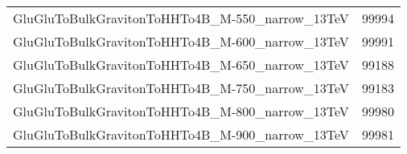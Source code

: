 \begin{table}[h]
\begin{tabular}{ll}
GluGluToBulkGravitonToHHTo4B\_M-550\_narrow\_13TeV & 99994            \\
GluGluToBulkGravitonToHHTo4B\_M-600\_narrow\_13TeV & 99991            \\
GluGluToBulkGravitonToHHTo4B\_M-650\_narrow\_13TeV & 99188            \\
GluGluToBulkGravitonToHHTo4B\_M-750\_narrow\_13TeV & 99183            \\
GluGluToBulkGravitonToHHTo4B\_M-800\_narrow\_13TeV & 99980            \\
GluGluToBulkGravitonToHHTo4B\_M-900\_narrow\_13TeV & 99981            \\ \hline
\end{tabular}
\label{tab:HbbbbSamples}
\end{table}


